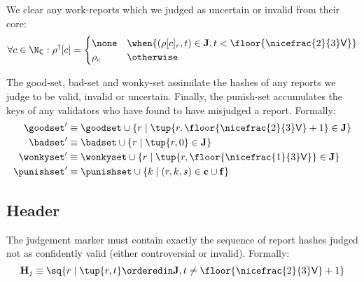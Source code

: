 We clear any work-reports which we judged as uncertain or invalid from their core:
\begin{equation}
  \forall c \in \N_\mathsf{C} : \rho^\dagger[c] = \begin{cases}
    \none &\when \{ (\rho[c]_r, t) \in \mathbf{J}, t < \floor{\nicefrac{2}{3}\mathsf{V}} \} \\
    \rho_c &\otherwise
  \end{cases}
\end{equation}

The good-set, bad-set and wonky-set assimilate the hashes of any reports we judge to be valid, invalid or uncertain. Finally, the punish-set accumulates the keys of any validators who have found to have misjudged a report. Formally:
\begin{align}
  \goodset' &\equiv \goodset \cup \{r \mid \tup{r, \floor{\nicefrac{2}{3}\mathsf{V}} + 1} \in \mathbf{J} \} \\
  \badset' &\equiv \badset \cup \{r \mid \tup{r, 0} \in \mathbf{J} \} \\
  \wonkyset' &\equiv \wonkyset \cup \{r \mid \tup{r, \floor{\nicefrac{1}{3}\mathsf{V}}} \in \mathbf{J} \} \\
  \punishset' &\equiv \punishset \cup \{ k \mid (r, k, s) \in \mathbf{c} \cup \mathbf{f} \}
\end{align}

\subsection{Header}\label{sec:judgementmarker}

The judgement marker must contain exactly the sequence of report hashes judged not as confidently valid (\ie either controversial or invalid). Formally:
\begin{equation}
  \mathbf{H}_j \equiv \sq{r \mid \tup{r, t} \orderedin \mathbf{J}, t \ne \floor{\nicefrac{2}{3}\mathsf{V}} + 1}
\end{equation}
